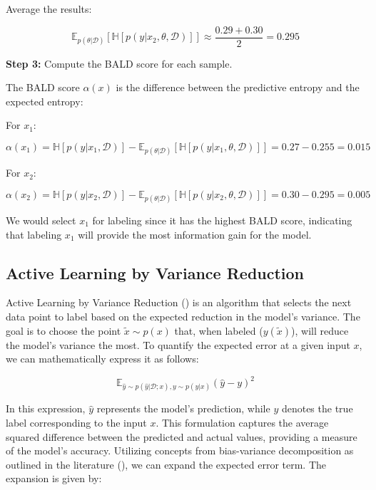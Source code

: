 \documentclass[
  letterpaper,
  numbers=noenddot,
  DIV=11,
  oneside]{scrreprt}
\theoremstyle{remark}
\begin{document}
Average the results:

\[
\mathbb{E}_{p(\theta|\mathcal{D})}[\mathbb{H}[p(y|x_2, \theta, \mathcal{D})]] \approx \frac{0.29 + 0.30}{2} = 0.295
\]

\textbf{Step 3:} Compute the BALD score for each sample.

The BALD score \(\alpha(x)\) is the difference between the predictive
entropy and the expected entropy:

For \(x_1\):

\[
\alpha(x_1) = \mathbb{H}[p(y|x_1, \mathcal{D})] - \mathbb{E}_{p(\theta|\mathcal{D})}[\mathbb{H}[p(y|x_1, \theta, \mathcal{D})]] = 0.27 - 0.255 = 0.015
\]

For \(x_2\):

\[
\alpha(x_2) = \mathbb{H}[p(y|x_2, \mathcal{D})] - \mathbb{E}_{p(\theta|\mathcal{D})}[\mathbb{H}[p(y|x_2, \theta, \mathcal{D})]] = 0.30 - 0.295 = 0.005
\]

We would select \(x_1\) for labeling since it has the highest BALD
score, indicating that labeling \(x_1\) will provide the most
information gain for the model.

\subsection{Active Learning by Variance
Reduction}\label{active-learning-by-variance-reduction}

Active Learning by Variance Reduction () is an algorithm that selects the next data
point to label based on the expected reduction in the model's variance.
The goal is to choose the point \(\tilde{x} \sim p(x)\) that, when
labeled (\(y(\tilde{x})\)), will reduce the model's variance the most.
To quantify the expected error at a given input \(x\), we can
mathematically express it as follows:

\[
\mathbb{E}_{\hat{y} \sim p(\hat{y} | \mathcal{D}; x), y \sim p(y|x)} (\hat{y} - y)^2
\]

In this expression, \(\hat{y}\) represents the model's prediction, while
\(y\) denotes the true label corresponding to the input \(x\). This
formulation captures the average squared difference between the
predicted and actual values, providing a measure of the model's
accuracy. Utilizing concepts from bias-variance decomposition as
outlined in the literature
(), we can expand the expected error term. The expansion is given
by:
\end{document}
